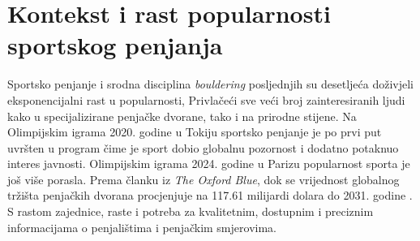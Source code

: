 \section{Kontekst i rast popularnosti sportskog penjanja} 

Sportsko penjanje i srodna disciplina \textit{bouldering} posljednjih su desetljeća doživjeli eksponencijalni rast u popularnosti, Privlačeći sve veći broj zainteresiranih ljudi kako u specijalizirane penjačke dvorane, tako i na prirodne stijene. Na Olimpijskim igrama 2020. godine u Tokiju sportsko penjanje je po prvi put uvršten u program čime je sport dobio globalnu pozornost i dodatno potaknuo interes javnosti. Olimpijskim igrama 2024. godine u Parizu popularnost sporta je još više porasla. Prema članku iz \textit{The Oxford Blue}, dok se vrijednost globalnog tržišta penjačkih dvorana procjenjuje na 117.61 milijardi dolara do 2031. godine \cite{the_oxford_blue_rock_climb}. S rastom zajednice, raste i potreba za kvalitetnim, dostupnim i preciznim informacijama o penjalištima i penjačkim smjerovima. 